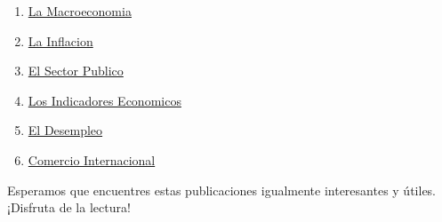 \documentclass[
  jou,
  floatsintext,
  longtable,
  a4paper,
  nolmodern,
  notxfonts,
  notimes,
  12pt,
  colorlinks=true,linkcolor=blue,citecolor=blue,urlcolor=blue]{apa7}
\begin{document}
\begin{enumerate}
  \href{https://achalmaedison.netlify.app/economia-preuniversitaria/2014-02-18-sistema-financiero}{Sistema
  Financiero}
\item
  \href{https://achalmaedison.netlify.app/economia-preuniversitaria/2014-02-25-la-macroeconomia/index.pdf}{}
  \href{https://achalmaedison.netlify.app/economia-preuniversitaria/2014-02-25-la-macroeconomia}{La
  Macroeconomia}
\item
  \href{https://achalmaedison.netlify.app/economia-preuniversitaria/2014-03-01-la-inflacion/index.pdf}{}
  \href{https://achalmaedison.netlify.app/economia-preuniversitaria/2014-03-01-la-inflacion}{La
  Inflacion}
\item
  \href{https://achalmaedison.netlify.app/economia-preuniversitaria/2014-03-08-el-sector-publico/index.pdf}{}
  \href{https://achalmaedison.netlify.app/economia-preuniversitaria/2014-03-08-el-sector-publico}{El
  Sector Publico}
\item
  \href{https://achalmaedison.netlify.app/economia-preuniversitaria/2014-03-15-los-indicadores-economicos/index.pdf}{}
  \href{https://achalmaedison.netlify.app/economia-preuniversitaria/2014-03-15-los-indicadores-economicos}{Los
  Indicadores Economicos}
\item
  \href{https://achalmaedison.netlify.app/economia-preuniversitaria/2014-03-22-el-desempleo/index.pdf}{}
  \href{https://achalmaedison.netlify.app/economia-preuniversitaria/2014-03-22-el-desempleo}{El
  Desempleo}
\item
  \href{https://achalmaedison.netlify.app/economia-preuniversitaria/2014-03-29-comercio-internacional/index.pdf}{}
  \href{https://achalmaedison.netlify.app/economia-preuniversitaria/2014-03-29-comercio-internacional}{Comercio
  Internacional}
\end{enumerate}

Esperamos que encuentres estas publicaciones igualmente interesantes y
útiles. ¡Disfruta de la lectura!
\end{document}

